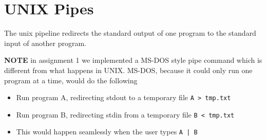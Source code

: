 
\section{UNIX Pipes}

The unix pipeline redirects the standard output of one program to the standard
input of another program.

\textbf{NOTE} in assignment 1 we implemented a MS-DOS style pipe command which
is different from what happens in UNIX. MS-DOS, because it could only run one
program at a time, would do the following
\begin{itemize}
\item Run program A, redirecting stdout to a temporary file \texttt{A >
    tmp.txt}
\item Run program B, redirecting stdin from a temporary file \texttt{B <
    tmp.txt}
\item This would happen seamlessly when the user types \texttt{A | B}
\end{itemize}


